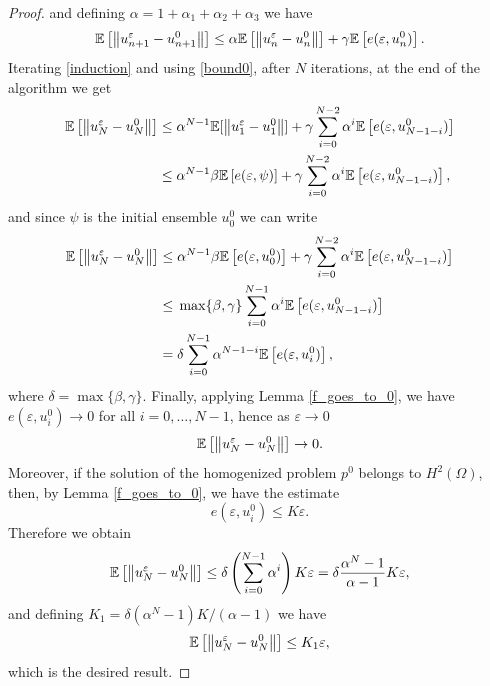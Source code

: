 \documentclass[10pt]{article}
\begin{document}
\begin{proof}
and defining $\alpha = 1 + \alpha_1 + \alpha_2 + \alpha_3$ we have
\begin{equation}
\label{induction}
\mathbb{E} \left [ \left\|u_{n+1}^{\varepsilon} - u_{n+1}^0\right\| \right ] \le \alpha \mathbb{E} \left [ \left\|u_n^{\varepsilon} - u_n^0\right\| \right ] + \gamma \mathbb{E} \left [ e(\varepsilon, u_n^0) \right ].
\end{equation}
Iterating \eqref{induction} and using \eqref{bound0}, after $N$ iterations, at the end of the algorithm we get
\begin{align*}
\mathbb{E} \left [ \left\|u_N^{\varepsilon} - u_N^0\right\| \right ] \le & \; \alpha^{N-1} \mathbb{E} [ \left\|u_1^{\varepsilon} - u_1^0\right\| ] + \gamma \sum_{i=0}^{N-2} \alpha^i \mathbb{E} \left [ e(\varepsilon, u^0_{N-1-i}) \right ] \\
\le & \; \alpha^{N-1} \beta \mathbb{E} \left [ e(\varepsilon, \psi) \right ] + \gamma \sum_{i=0}^{N-2} \alpha^i \mathbb{E} \left [ e(\varepsilon, u^0_{N-1-i}) \right ],
\end{align*}
and since $\psi$ is the initial ensemble $u_0^0$ we can write
\begin{align*}
\mathbb{E} \left [ \left\|u_N^{\varepsilon} - u_N^0\right\| \right ] \le & \; \alpha^{N-1} \beta \mathbb{E} \left [ e(\varepsilon, u_0^0) \right ] + \gamma \sum_{i=0}^{N-2} \alpha^i \mathbb{E} \left [ e(\varepsilon, u^0_{N-1-i}) \right ] \\
\le & \; \max \{ \beta, \gamma \} \sum_{i=0}^{N-1} \alpha^i \mathbb{E} \left [ e(\varepsilon, u^0_{N-1-i}) \right ] \\
= & \; \delta \sum_{i=0}^{N-1} \alpha^{N-1-i} \mathbb{E} \left [ e(\varepsilon, u^0_i) \right ],
\end{align*}
where $\delta = \max \{ \beta, \gamma \}$. Finally, applying Lemma \ref{f_goes_to_0}, we have $e(\varepsilon, u_i^0) \to 0$ for all $i = 0, \dots, N-1$, hence as $\varepsilon \to 0$
\begin{equation*}
\mathbb{E} \left [ \left\|u_N^{\varepsilon} - u_N^0\right\| \right ] \to 0.
\end{equation*}
Moreover, if the solution of the homogenized problem $p^0$ belongs to $H^2(\Omega)$, then, by Lemma \ref{f_goes_to_0}, we have the estimate 
\[ e(\varepsilon, u_i^0) \le K \varepsilon. \]
Therefore we obtain
\begin{equation*}
\mathbb{E} \left [ \left\|u_N^{\varepsilon} - u_N^0\right\| \right ] \le \delta \left ( \sum_{i=0}^{N-1} \alpha^{i} \right ) K \varepsilon = \delta \frac{\alpha^N - 1}{\alpha - 1} K \varepsilon,
\end{equation*}
and defining $K_1 = \delta (\alpha^N - 1) K /(\alpha - 1)$ we have
\[ \mathbb{E} \left [ \left\|u_N^{\varepsilon} - u_N^0\right\| \right ] \le K_1 \varepsilon, \]
which is the desired result.
\end{proof}
\end{document}
